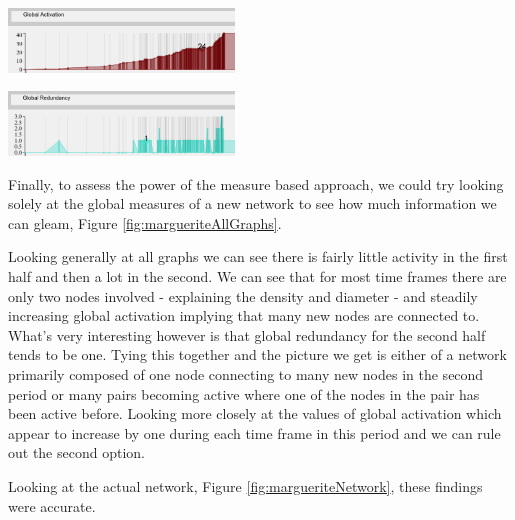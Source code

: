 \begin{multicols}{2}
\begin{center}
\includegraphics[trim={0 0 0 0}, width=60mm]{./Figures/margueriteGlobalActivation.png}
\end{center}
\begin{center}
\includegraphics[trim={0 0 0 0}, width=60mm]{./Figures/margueriteGlobalRedundancy.png}
\end{center}
\label{fig:margueriteAllGraphs}
\columnbreak
[Reference]
Finally, to assess the power of the measure based approach, we could try looking solely at the global measures of a new network to see how much information we can gleam, Figure \ref{fig:margueriteAllGraphs}. 

Looking generally at all graphs we can see there is fairly little activity in the first half and then a lot in the second. We can see that for most time frames there are only two nodes involved - explaining the density and diameter - and steadily increasing global activation implying that many new nodes are connected to. What's very interesting however is that global redundancy for the second half tends to be one. Tying this together and the picture we get is either of a network primarily composed of one node connecting to many new nodes in the second period or many pairs becoming active where one of the nodes in the pair has been active before. Looking more closely at the values of global activation which appear to increase by one during each time frame in this period and we can rule out the second option.
\end{multicols}

Looking at the actual network, Figure \ref{fig:margueriteNetwork}, these findings were accurate. 

